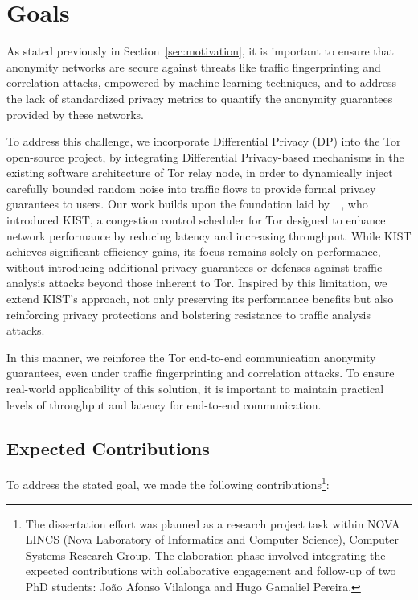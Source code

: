 \section{Goals}\label{sec:goals}

As stated previously in Section~\ref{sec:motivation}, it is important to ensure that anonymity networks are secure against threats like traffic fingerprinting and correlation attacks, empowered by machine learning techniques, and to address the lack of standardized privacy metrics to quantify the anonymity guarantees provided by these networks.

To address this challenge, we incorporate Differential Privacy (DP) into the Tor open-source project, by integrating Differential Privacy-based mechanisms in the existing software architecture of Tor relay node, in order to dynamically inject carefully bounded random noise into traffic flows to provide formal privacy guarantees to users. 
Our work builds upon the foundation laid by~\citeauthor{KIST}~\cite{KIST}, who introduced KIST, a congestion control scheduler for Tor designed to enhance network performance by reducing latency and increasing throughput. While KIST achieves significant efficiency gains, its focus remains solely on performance, without introducing additional privacy guarantees or defenses against traffic analysis attacks beyond those inherent to Tor. Inspired by this limitation, we extend KIST's approach, not only preserving its performance benefits but also reinforcing privacy protections and bolstering resistance to traffic analysis attacks.

In this manner, we reinforce the Tor end-to-end communication anonymity guarantees, even under traffic fingerprinting and correlation attacks. To ensure real-world applicability of this solution, it is important to maintain practical levels of throughput and latency for end-to-end communication. 

\subsection{Expected Contributions}\label{sub:contributions}

To address the stated goal, we made the following contributions\footnote{The dissertation effort was planned as a research project task within NOVA LINCS (Nova Laboratory of Informatics and Computer Science), Computer Systems Research Group. The elaboration phase involved integrating the expected contributions with collaborative engagement and follow-up of two PhD students: João Afonso Vilalonga and Hugo Gamaliel Pereira.}:

